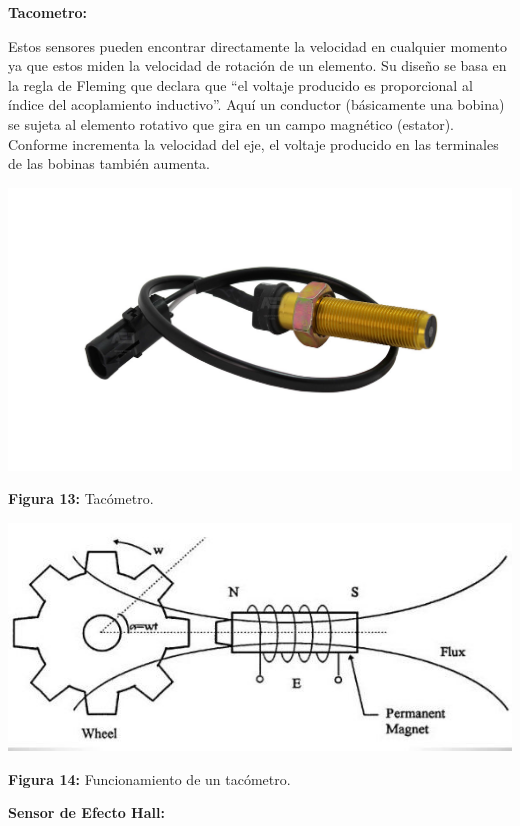 \vspace{10mm}
\textbf{Tacometro:}

Estos sensores pueden encontrar directamente la velocidad en cualquier momento ya que estos miden la velocidad de rotación de un elemento. Su diseño se basa en la regla de Fleming que declara que “el voltaje producido es proporcional al índice del acoplamiento inductivo”. Aquí un conductor (básicamente una bobina) se sujeta al elemento rotativo que gira en un campo magnético (estator). Conforme incrementa la velocidad del eje, el voltaje producido en las terminales de las bobinas también aumenta.

\vspace{5mm}

\begin{center}
	\includegraphics[width=0.5\linewidth, height=0.2\textheight]{img/tacometro}
	
	\vspace{2mm} %
	
	\textbf{Figura 13:} Tacómetro.
\end{center}

\vspace{5mm} %

\begin{center}
	\includegraphics[width=0.7\linewidth]{img/Sveltaco}
	
	\vspace{2mm} %
	
	\textbf{Figura 14:} Funcionamiento de un tacómetro.
\end{center}
\vspace{10mm}
\textbf{Sensor de Efecto Hall:}

